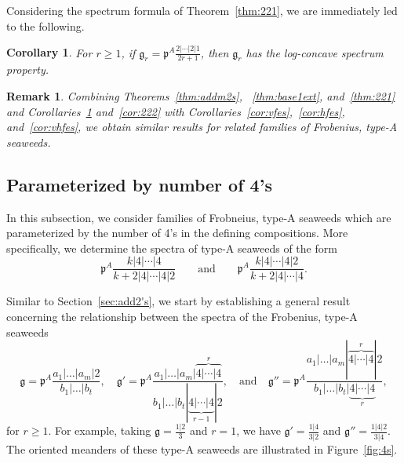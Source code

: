 \documentclass[letterpaper,10pt]{article}
\newtheorem{corollary}[theorem]{Corollary}
\newtheorem{remark}[theorem]{Remark}
\begin{document}
Considering the spectrum formula of Theorem~\ref{thm:221}, we are immediately led to the following.

\begin{corollary}\label{cor:221}
For $r\ge 1$, if $\mathfrak{g}_r=\mathfrak{p}^A\frac{2|\cdots|2|1}{2r+1}$, then $\mathfrak{g}_r$ has the log-concave spectrum property.
\end{corollary}

\begin{remark}
    Combining Theorems~\ref{thm:addm2s}, ~\ref{thm:base1ext}, and~\ref{thm:221} and Corollaries~\ref{cor:221} and~\ref{cor:222} with Corollaries~\ref{cor:vfes},~\ref{cor:hfes}, and~\ref{cor:vhfes}, we obtain similar results for related families of Frobenius, type-A seaweeds.
\end{remark}


\subsection{Parameterized by number of 4's}\label{sec:add4's}

In this subsection, we consider families of Frobneius, type-A seaweeds which are parameterized by the number of 4's in the defining compositions. More specifically, we determine the spectra of type-A seaweeds of the form $$\mathfrak{p}^A\frac{k|4|\cdots|4}{k+2|4|\cdots|4|2}\quad\quad\text{and}\quad\quad \mathfrak{p}^A\frac{k|4|\cdots|4|2}{k+2|4|\cdots|4}.$$

Similar to Section~\ref{sec:add2's}, we start by establishing a general result concerning the relationship between the spectra of the Frobenius, type-A seaweeds $$\mathfrak{g}=\mathfrak{p}^A\frac{a_1|\hdots|a_m|2}{b_1|\hdots|b_t},\quad \mathfrak{g}'=\mathfrak{p}^A\frac{a_1|\hdots|a_m|\overbrace{4|\cdots|4}^r}{b_1|\hdots|b_t|\underbrace{4|\cdots|4}_{r-1}|2},\quad\text{and}\quad \mathfrak{g}''=\mathfrak{p}^A\frac{a_1|\hdots|a_m|\overbrace{4|\cdots|4}^r|2}{b_1|\hdots|b_t|\underbrace{4|\cdots|4}_{r}},$$ for $r\ge 1$. For example, taking $\mathfrak{g}=\frac{1|2}{3}$ and $r=1$, we have $\mathfrak{g}'=\frac{1|4}{3|2}$ and  $\mathfrak{g}''=\frac{1|4|2}{3|4}$. The oriented meanders of these type-A seaweeds are illustrated in Figure~\ref{fig:4s}.
\end{document}

